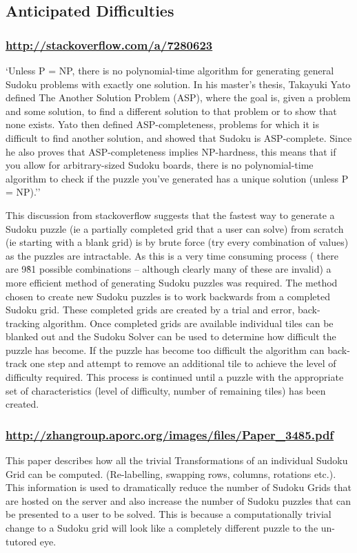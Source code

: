 \documentclass[fleqn]{article}
\begin{document}
\subsection{Anticipated Difficulties}

\subsubsection*{\url{http://stackoverflow.com/a/7280623}}
‘Unless P = NP, there is no polynomial-time algorithm for generating general Sudoku problems with exactly one solution.
In his master's thesis, Takayuki Yato defined The Another Solution Problem (ASP), where the goal is, given a problem and some solution, to find a different solution to that problem or to show that none exists. Yato then defined ASP-completeness, problems for which it is difficult to find another solution, and showed that Sudoku is ASP-complete. Since he also proves that ASP-completeness implies NP-hardness, this means that if you allow for arbitrary-sized Sudoku boards, there is no polynomial-time algorithm to check if the puzzle you've generated has a unique solution (unless P = NP).’’

This discussion from stackoverflow suggests that the fastest way to generate a Sudoku puzzle (ie a partially completed grid that a user can solve) from scratch (ie starting with a blank grid) is by brute force (try every combination of values) as the puzzles are intractable. As this is a very time consuming process ( there are 9\^81 possible combinations – although clearly many of these are invalid) a more efficient method of generating Sudoku puzzles was required.
The method chosen to create new Sudoku puzzles is to work backwards from a completed Sudoku grid. These completed grids are created by a trial and error, back-tracking algorithm. Once completed grids are available individual tiles can be blanked out and the Sudoku Solver can be used to determine how difficult the puzzle has become. If the puzzle has become too difficult the algorithm can back-track one step and attempt to remove an additional tile to achieve the level of difficulty required. This process is continued until a puzzle with the appropriate set of characteristics (level of difficulty, number of remaining tiles) has been created.

\subsubsection*{\url{http://zhangroup.aporc.org/images/files/Paper_3485.pdf}}
This paper describes how all the trivial Transformations of an individual Sudoku Grid can be computed. (Re-labelling, swapping rows, columns, rotations etc.). This information is used to dramatically reduce the number of Sudoku Grids that are hosted on the server and also increase the number of Sudoku puzzles that can be presented to a user to be solved. This is because a computationally trivial change to a Sudoku grid will look like a completely different puzzle to the un-tutored eye.
\end{document}
